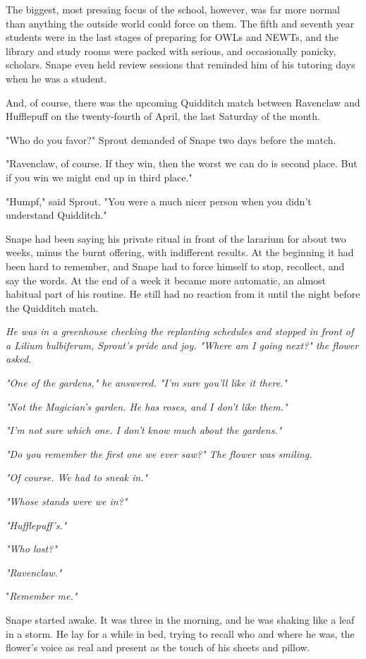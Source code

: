 The biggest, most pressing focus of the school, however, was far more normal than anything the outside world could force on them. The fifth and seventh year students were in the last stages of preparing for OWLs and NEWTs, and the library and study rooms were packed with serious, and occasionally panicky, scholars. Snape even held review sessions that reminded him of his tutoring days when he was a student.

And, of course, there was the upcoming Quidditch match between Ravenclaw and Hufflepuff on the twenty-fourth of April, the last Saturday of the month.

"Who do you favor?" Sprout demanded of Snape two days before the match.

"Ravenclaw, of course. If they win, then the worst we can do is second place. But if you win we might end up in third place."

"Humpf," said Sprout. "You were a much nicer person when you didn't understand Quidditch."

Snape had been saying his private ritual in front of the lararium for about two weeks, minus the burnt offering, with indifferent results. At the beginning it had been hard to remember, and Snape had to force himself to stop, recollect, and say the words. At the end of a week it became more automatic, an almost habitual part of his routine. He still had no reaction from it until the night before the Quidditch match.

\emph{He was in a greenhouse checking the replanting schedules and stopped in front of a Lilium bulbiferum, Sprout's pride and joy. "Where am I going next?" the flower asked.}

\emph{"One of the gardens," he answered. "I'm sure you'll like it there."}

\emph{"Not the Magician's garden. He has roses, and I don't like them."}

\emph{"I'm not sure which one. I don't know much about the gardens."}

\emph{"Do you remember the first one we ever saw?" The flower was smiling.}

\emph{"Of course. We had to sneak in."}

\emph{"Whose stands were we in?"}

\emph{"Hufflepuff's."}

\emph{"Who lost?"}

\emph{"Ravenclaw."}

"\emph{Remember me."}

Snape started awake. It was three in the morning, and he was shaking like a leaf in a storm. He lay for a while in bed, trying to recall who and where he was, the flower's voice as real and present as the touch of his sheets and pillow.

